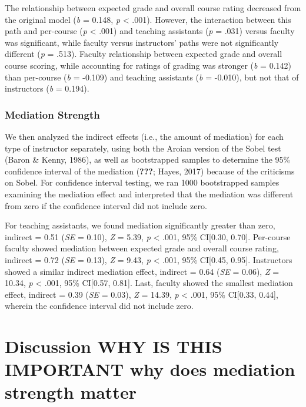 \documentclass[,man]{apa6}
\theoremstyle{definition}
\theoremstyle{definition}
\theoremstyle{definition}
\theoremstyle{remark}
\begin{document}
The relationship between expected grade and overall course rating
decreased from the original model (\emph{b} = 0.148, \emph{p}
\textless{} .001). However, the interaction between this path and
per-course (\emph{p} \textless{} .001) and teaching assistants (\emph{p}
= .031) versus faculty was significant, while faculty versus
instructors' paths were not significantly different (\emph{p} = .513).
Faculty relationship between expected grade and overall course scoring,
while accounting for ratings of grading was stronger (\emph{b} = 0.142)
than per-course (\emph{b} = -0.109) and teaching assistants (\emph{b} =
-0.010), but not that of instructors (\emph{b} = 0.194).

\hypertarget{mediation-strength}{%
\subsubsection{Mediation Strength}\label{mediation-strength}}

We then analyzed the indirect effects (i.e., the amount of mediation)
for each type of instructor separately, using both the Aroian version of
the Sobel test (Baron \& Kenny, 1986), as well as bootstrapped samples
to determine the 95\% confidence interval of the mediation
({\textbf{???}}; Hayes, 2017) because of the criticisms on Sobel. For
confidence interval testing, we ran 1000 bootstrapped samples examining
the mediation effect and interpreted that the mediation was different
from zero if the confidence interval did not include zero.

For teaching assistants, we found mediation significantly greater than
zero, indirect = 0.51 (\emph{SE} = 0.10), \emph{Z} = 5.39, \emph{p}
\textless{} .001, 95\% CI{[}0.30, 0.70{]}. Per-course faculty showed
mediation between expected grade and overall course rating, indirect =
0.72 (\emph{SE} = 0.13), \emph{Z} = 9.43, \emph{p} \textless{} .001,
95\% CI{[}0.45, 0.95{]}. Instructors showed a similar indirect mediation
effect, indirect = 0.64 (\emph{SE} = 0.06), \emph{Z} = 10.34, \emph{p}
\textless{} .001, 95\% CI{[}0.57, 0.81{]}. Last, faculty showed the
smallest mediation effect, indirect = 0.39 (\emph{SE} = 0.03), \emph{Z}
= 14.39, \emph{p} \textless{} .001, 95\% CI{[}0.33, 0.44{]}, wherein the
confidence interval did not include zero.

\hypertarget{discussion-why-is-this-important-why-does-mediation-strength-matter}{%
\section{Discussion WHY IS THIS IMPORTANT why does mediation strength
matter}\label{discussion-why-is-this-important-why-does-mediation-strength-matter}}
\end{document}
